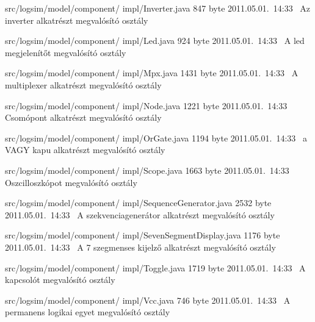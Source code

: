 \begin{fajllista}
\fajl
{src/logsim/model/component/\newline
impl/Inverter.java} %
{847 byte} %
{2011.05.01.~14:33~} %
{Az inverter alkatrészt megvalósító osztály} %

\fajl
{src/logsim/model/component/\newline
impl/Led.java} %
{924 byte} %
{2011.05.01.~14:33~} %
{A led megjelenítőt megvalósító osztály} %

\fajl
{src/logsim/model/component/\newline
impl/Mpx.java} %
{1431 byte} %
{2011.05.01.~14:33~} %
{A multiplexer alkatrészt megvalósító osztály} %

\fajl
{src/logsim/model/component/\newline
impl/Node.java} %
{1221 byte} %
{2011.05.01.~14:33~} %
{Csomópont alkatrészt megvalósító osztály} %

\fajl
{src/logsim/model/component/\newline
impl/OrGate.java} %
{1194 byte} %
{2011.05.01.~14:33~} %
{a VAGY kapu alkatrészt megvalósító osztály} %

\fajl
{src/logsim/model/component/\newline
impl/Scope.java} %
{1663 byte} %
{2011.05.01.~14:33~} %
{Oszcilloszkópot megvalósító osztály} %

\fajl
{src/logsim/model/component/\newline
impl/SequenceGenerator.java} %
{2532 byte} %
{2011.05.01.~14:33~} %
{A szekvenciagenerátor alkatrészt megvalósító osztály} %

\fajl
{src/logsim/model/component/\newline
impl/SevenSegmentDisplay.java} %
{1176 byte} %
{2011.05.01.~14:33~} %
{A 7 szegmenses kijelző alkatrészt megvalósító osztály} %

\fajl
{src/logsim/model/component/\newline
impl/Toggle.java} %
{1719 byte} %
{2011.05.01.~14:33~} %
{A kapcsolót megvalósító osztály} %

\fajl
{src/logsim/model/component/\newline
impl/Vcc.java} %
{746 byte} %
{2011.05.01.~14:33~} %
{A permanens logikai egyet megvalósító osztály} %


\end{fajllista}

